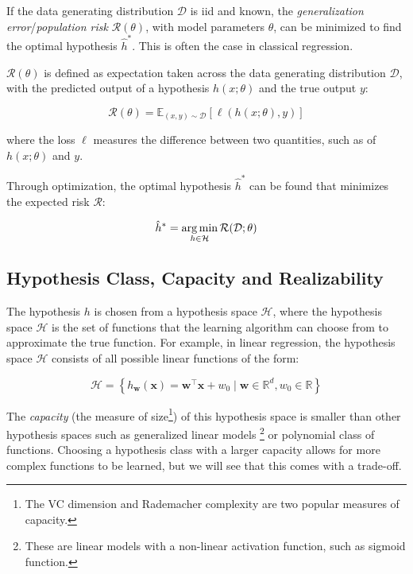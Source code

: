 If the data generating distribution $\mathcal{D}$ is \gls{iid} and known, the \textit{generalization error}/\textit{population risk} $\mathcal{R}(\theta)$, with model parameters $\theta$, can be minimized to find the optimal hypothesis $\hat{h}^*$. This is often the case in classical regression.

$\mathcal{R}(\theta)$ is defined as expectation taken across the data generating distribution $\mathcal{D}$, with the predicted output of a hypothesis $h(x; \theta)$ and the true output $y$:

\begin{equation}
    \mathcal{R}(\theta) = \mathbb{E}_{(x, y) \sim \mathcal{D}} \left[ \ell(h(x; \theta), y) \right]
\end{equation}

where the loss $\ell$ measures the difference between two quantities, such as of $h(x; \theta)$ and $y$.

Through optimization, the optimal hypothesis $\hat{h}^*$ can be found that minimizes the expected risk $\mathcal{R}$:

\begin{equation}
    \hat{h}^* = \operatorname*{arg\,min}_{h \in \mathcal{H}} \mathcal{R}(\mathcal{D}; \theta)
\end{equation}

\subsection{Hypothesis Class, Capacity and Realizability}
The hypothesis $h$ is chosen from a hypothesis space $\mathcal{H}$, where the hypothesis space $\mathcal{H}$ is the set of functions that the learning algorithm can choose from to approximate the true function. 
For example, in linear regression, the hypothesis space $\mathcal{H}$ consists of all possible linear functions of the form:

\begin{equation*}
   \mathcal{H} =  \left\{ h_{\mathbf{w}}(\mathbf{x}) = \mathbf{w}^\top \mathbf{x} + w_0 \mid \mathbf{w} \in \mathbb{R}^d, w_0 \in \mathbb{R} \right\}
\end{equation*}

The \textit{capacity} (the measure of size\footnote{The VC dimension and Rademacher complexity are two popular measures of capacity.}) of this hypothesis space is smaller than other hypothesis spaces such as generalized linear models
\footnote{These are linear models with a non-linear activation function, such as sigmoid function.} 
or polynomial class of functions. Choosing a hypothesis class with a larger capacity allows for more complex functions to be learned, but we will see that this comes with a trade-off.

